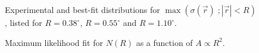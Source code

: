 \begin{figure}[p!]
\caption{\label{FIG::ANALYSIS::2DSIGMADISTRIBUTIONS} 
Experimental and best-fit distributions for 
$\max(\sigma(\vec{r})\;;|\vec{r}|<R)$, listed
for $R=0.38^\circ$, $R=0.55^\circ$ and $R=1.10^\circ$.}
\end{figure}

\begin{figure}[p!]
\centerline{}
\caption{\label{FIG::ANALYSIS::NINDEPENDENTLIKELIHOOD} 
Maximum likelihood fit for $N(R)$ as a function of $A\propto R^2$.}
\end{figure}

